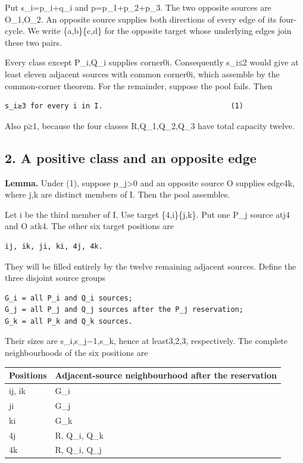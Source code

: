 \documentclass[
  10pt,
]{article}
\begin{document}
Put s\_i=p\_i+q\_i and p=p\_1+p\_2+p\_3. The two opposite sources are
O\_1,O\_2. An opposite source supplies both directions of every edge of
its four-cycle. We write \{a,b\}\textbar\{c,d\} for the opposite target
whose underlying edges join these two pairs.

Every class except P\_i,Q\_i supplies corner0i. Consequently s\_i≤2
would give at least eleven adjacent sources with common corner0i, which
assemble by the common-corner theorem. For the remainder, suppose the
pool fails. Then

\begin{verbatim}
s_i≥3 for every i in I.                              (1)
\end{verbatim}

Also p≥1, because the four classes R,Q\_1,Q\_2,Q\_3 have total capacity
twelve.

\hypertarget{a-positive-class-and-an-opposite-edge}{%
\subsection*{2. A positive class and an opposite
edge}\label{a-positive-class-and-an-opposite-edge}}

\textbf{Lemma.} Under (1), suppose p\_j\textgreater0 and an opposite
source O supplies edge4k, where j,k are distinct members of I. Then the
pool assembles.

Let i be the third member of I. Use target \{4,i\}\textbar\{j,k\}. Put
one P\_j source atj4 and O atk4. The other six target positions are

\begin{verbatim}
ij, ik, ji, ki, 4j, 4k.
\end{verbatim}

They will be filled entirely by the twelve remaining adjacent sources.
Define the three disjoint source groups

\begin{verbatim}
G_i = all P_i and Q_i sources;
G_j = all P_j and Q_j sources after the P_j reservation;
G_k = all P_k and Q_k sources.
\end{verbatim}

Their sizes are s\_i,s\_j−1,s\_k, hence at least3,2,3, respectively. The
complete neighbourhoods of the six positions are

\begin{longtable}[]{@{}ll@{}}
\toprule\noalign{}
Positions & Adjacent-source neighbourhood after the reservation \\
\midrule\noalign{}
\endhead
\bottomrule\noalign{}
\endlastfoot
ij, ik & G\_i \\
ji & G\_j \\
ki & G\_k \\
4j & R, Q\_i, Q\_k \\
4k & R, Q\_i, Q\_j \\
\end{longtable}
\end{document}
